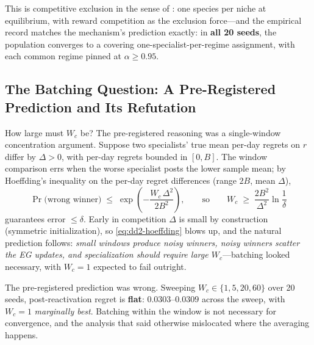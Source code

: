 This is competitive exclusion in the sense of \citet{li2026gause}: one
species per niche at equilibrium, with reward competition as the exclusion
force---and the empirical record matches the mechanism's prediction exactly:
in \textbf{all 20 seeds}, the population converges to a covering
one-specialist-per-regime assignment, with each common regime pinned at
$\alpha \ge 0.95$.

\subsection{The Batching Question: A Pre-Registered Prediction and Its Refutation}
\label{sec:dd2-batching}

How large must $W_c$ be? The pre-registered reasoning was a single-window
concentration argument. Suppose two specialists' true mean per-day regrets
on $r$ differ by $\Delta > 0$, with per-day regrets bounded in $[0, B]$. The
window comparison errs when the worse specialist posts the lower sample
mean; by Hoeffding's inequality on the per-day regret differences (range
$2B$, mean $\Delta$),
\begin{equation}
\label{eq:dd2-hoeffding}
\Pr\bigl(\text{wrong winner}\bigr)
\;\le\; \exp\!\left( - \frac{W_c\, \Delta^2}{2 B^2} \right),
\qquad \text{so} \qquad
W_c \;\ge\; \frac{2 B^2}{\Delta^2} \ln \frac{1}{\delta}
\end{equation}
guarantees error $\le \delta$. Early in competition $\Delta$ is small by
construction (symmetric initialization), so \eqref{eq:dd2-hoeffding} blows
up, and the natural prediction follows: \emph{small windows produce noisy
winners, noisy winners scatter the EG updates, and specialization should
require large $W_c$}---batching looked necessary, with $W_c = 1$ expected to
fail outright.

\begin{keypoint}[title={The empirical refutation, stated plainly}]
The pre-registered prediction was wrong. Sweeping
$W_c \in \{1, 5, 20, 60\}$ over 20 seeds, post-reactivation regret is
\textbf{flat}: $0.0303$--$0.0309$ across the sweep, with $W_c = 1$
\emph{marginally best}. Batching within the window is not necessary for
convergence, and the analysis that said otherwise mislocated where the
averaging happens.
\end{keypoint}

